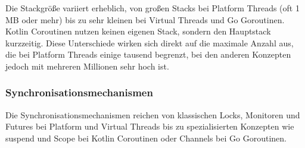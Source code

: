 \documentclass[fontsize=12pt,paper=a4,twoside=semi,parskip=half-,headsepline,headinclude]{scrreprt}
\begin{document}
Die Stackgröße variiert erheblich, von großen Stacks bei Platform Threads (oft 1 MB oder mehr) bis zu sehr kleinen bei Virtual Threads und Go Goroutinen. Kotlin Coroutinen nutzen keinen eigenen Stack, sondern den Hauptstack kurzzeitig. Diese Unterschiede wirken sich direkt auf die maximale Anzahl aus, die bei Platform Threads einige tausend begrenzt, bei den anderen Konzepten jedoch mit mehreren Millionen sehr hoch ist.

\subsubsection{Synchronisationsmechanismen}

Die Synchronisationsmechanismen reichen von klassischen Locks, Monitoren und Futures bei Platform und Virtual Threads bis zu spezialisierten Konzepten wie suspend und Scope bei Kotlin Coroutinen oder Channels bei Go Goroutinen. 
\end{document}
